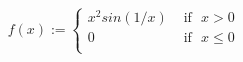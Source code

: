 \documentclass[preview]{standalone}
\begin{document}
\begin{align*}
f(x) := \begin{cases}x^{2}sin(1/x)  &  \text{ if} \ \ \  x > 0 \\0 &  \text{ if} \ \ \ x \leq 0 \\\end{cases}
\end{align*}
\end{document}
